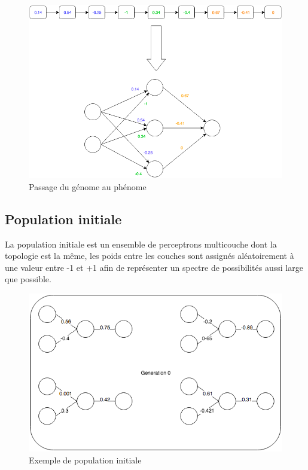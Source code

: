 \documentclass{article}
\begin{document}
\begin{figure}[H]
\begin{center}
	\includegraphics[scale=0.5]{genomephenome.png}
	\caption{Passage du génome au phénome}
\end{center}
\end{figure}

\subsection{Population initiale}

La population initiale est un ensemble de perceptrons multicouche dont la topologie est la même, les poids entre les couches sont assignés aléatoirement à une valeur entre -1 et +1 afin de représenter un spectre de possibilités aussi large que possible.
\begin{figure}[H]
\begin{center}
	\includegraphics[scale=0.6]{gen0mlp.png} 
	\caption{Exemple de population initiale}
\end{center}
\end{figure}
\end{document}
